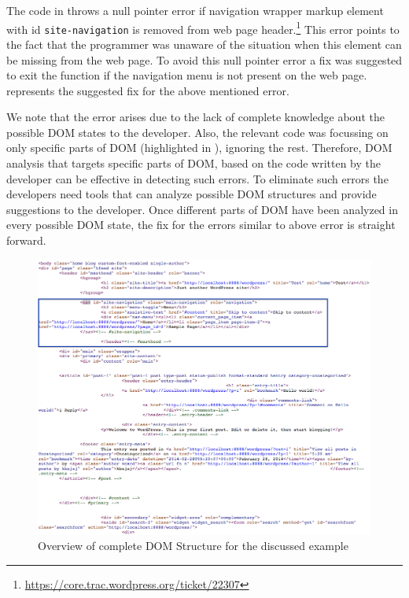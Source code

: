 	The \javascript code in  throws a null pointer error if navigation wrapper markup \ie element with id \texttt{site-navigation} is removed from web page header.\footnote{\url{https://core.trac.wordpress.org/ticket/22307}} This error points to the fact that the programmer was unaware of the situation when this element can be missing from the web page. To avoid this null pointer error a fix was suggested to exit the function if the navigation menu is not present on the web page.  represents the suggested fix for the above mentioned error.
	
	We note that the error arises due to the lack of complete knowledge about the possible DOM states to the developer. Also, the relevant \javascript code was focussing on only specific parts of DOM (highlighted in ), ignoring the rest. Therefore, DOM analysis that targets specific parts of DOM, based on the \javascript code written by the developer can be effective in detecting such errors. To eliminate such errors the developers need tools that can analyze possible DOM structures and provide suggestions to the developer. Once different parts of DOM have been analyzed in every possible DOM state, the fix for the errors similar to above error is straight forward.
	
		
	\begin{figure}
		\centering
		\includegraphics[width=175mm]{images/layout.png}
		\caption{Overview of complete DOM Structure for the discussed example}
		\label{Fig:Structure}
	\end{figure}
	
